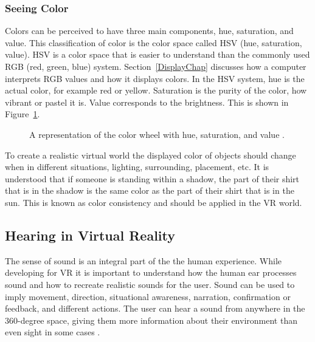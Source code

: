\subsubsection{Seeing Color}
Colors can be perceived to have three main components, hue, saturation, and value. This classification of color is the color space called HSV (hue, saturation, value). HSV is a color space that is easier to understand than the commonly used RGB (red, green, blue) system. Section~\ref{DisplayChap} discusses how a computer interprets RGB values and how it displays colors. In the HSV system, hue is the actual color, for example red or yellow. Saturation is the purity of the color, how vibrant or pastel it is. Value corresponds to the brightness. This is shown in Figure~\ref{fig:colors}.  
\begin{figure}[!ht]
	\begin{center}
	\end{center}
	\caption{A representation of the color wheel with hue, saturation, and value \cite{LaValle2017}.} \label{fig:colors}
\end{figure} To create a realistic virtual world the displayed color of objects should change when in different situations, lighting, surrounding, placement, etc. It is understood that if someone is standing within a shadow, the part of their shirt that is in the shadow is the same color as the part of their shirt that is in the sun. This is known as color consistency and should be applied in the VR world. 

\subsection{Hearing in Virtual Reality}
The sense of sound is an integral part of the the human experience. While developing for VR it is important to understand how the human ear processes sound and how to recreate realistic sounds for the user. Sound can be used to imply movement, direction, situational awareness, narration, confirmation or feedback, and different actions. The user can hear a sound from anywhere in the 360-degree space, giving them more information about their environment than even sight in some cases \cite{Madole1995}. 

